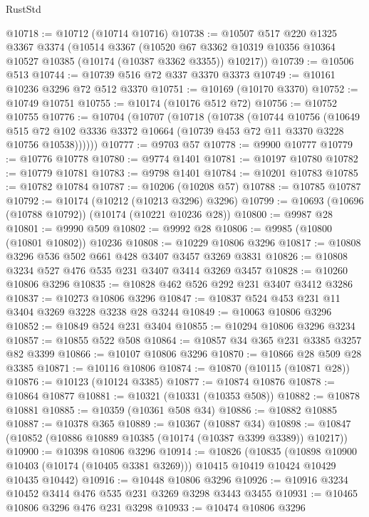\begin{lexlean}{RustStd}
\begin{coremodule}
@10718 := @10712 (@10714 @10716)
@10738 := @10507
    @517
    @220
    @1325
    @3367
    @3374
    (@10514
      @3367
      (@10520 @67 @3362 @10319 @10356 @10364 @10527 @10385 (@10174 (@10387 @3362 @3355)) @10217))
@10739 := @10506 @513
@10744 := @10739 @516 @72 @337 @3370 @3373
@10749 := @10161 @10236 @3296 @72 @512 @3370
@10751 := @10169 (@10170 @3370)
@10752 := @10749 @10751
@10755 := @10174 (@10176 @512 @72)
@10756 := @10752 @10755
@10776 := @10704
    (@10707
      (@10718
        (@10738
          (@10744
            @10756
            (@10649
              @515
              @72
              @102
              @3336
              @3372
              @10664
              (@10739 @453 @72 @11 @3370 @3228 @10756 @10538))))))
@10777 := @9703 @57
@10778 := @9900 @10777
@10779 := @10776 @10778
@10780 := @9774 @1401
@10781 := @10197 @10780
@10782 := @10779 @10781
@10783 := @9798 @1401
@10784 := @10201 @10783
@10785 := @10782 @10784
@10787 := @10206 (@10208 @57)
@10788 := @10785 @10787
@10792 := @10174 (@10212 (@10213 @3296) @3296)
@10799 := @10693 (@10696 (@10788 @10792)) (@10174 (@10221 @10236 @28))
@10800 := @9987 @28
@10801 := @9990 @509
@10802 := @9992 @28
@10806 := @9985 (@10800 (@10801 @10802)) @10236
@10808 := @10229 @10806 @3296
@10817 := @10808 @3296 @536 @502 @661 @428 @3407 @3457 @3269 @3831
@10826 := @10808 @3234 @527 @476 @535 @231 @3407 @3414 @3269 @3457
@10828 := @10260 @10806 @3296
@10835 := @10828 @462 @526 @292 @231 @3407 @3412 @3286
@10837 := @10273 @10806 @3296
@10847 := @10837 @524 @453 @231 @11 @3404 @3269 @3228 @3238 @28 @3244
@10849 := @10063 @10806 @3296
@10852 := @10849 @524 @231 @3404
@10855 := @10294 @10806 @3296 @3234
@10857 := @10855 @522 @508
@10864 := @10857 @34 @365 @231 @3385 @3257 @82 @3399
@10866 := @10107 @10806 @3296
@10870 := @10866 @28 @509 @28 @3385
@10871 := @10116 @10806
@10874 := @10870 (@10115 (@10871 @28))
@10876 := @10123 (@10124 @3385)
@10877 := @10874 @10876
@10878 := @10864 @10877
@10881 := @10321 (@10331 (@10353 @508))
@10882 := @10878 @10881
@10885 := @10359 (@10361 @508 @34)
@10886 := @10882 @10885
@10887 := @10378 @365
@10889 := @10367 (@10887 @34)
@10898 := @10847 (@10852 (@10886 @10889 @10385 (@10174 (@10387 @3399 @3389)) @10217))
@10900 := @10398 @10806 @3296
@10914 := @10826
    (@10835
      (@10898 @10900 @10403 (@10174 (@10405 @3381 @3269)))
      @10415
      @10419
      @10424
      @10429
      @10435
      @10442)
@10916 := @10448 @10806 @3296
@10926 := @10916 @3234 @10452 @3414 @476 @535 @231 @3269 @3298 @3443 @3455
@10931 := @10465 @10806 @3296 @476 @231 @3298
@10933 := @10474 @10806 @3296

\end{coremodule}
\end{lexlean}
